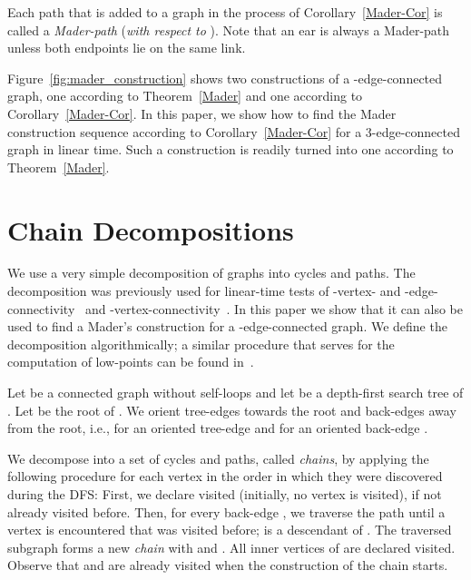 \documentclass[paper=a4]{scrartcl}
\begin{document}
Each path that is added to a graph  in the process of Corollary~\ref{Mader-Cor} is called a \emph{Mader-path} (\emph{with respect to }). Note that an ear is always a Mader-path unless both endpoints lie on the same link.

Figure~\ref{fig:mader_construction} shows two constructions of a -edge-connected graph, one according to Theorem~\ref{Mader} and one according to Corollary~\ref{Mader-Cor}. In this paper, we show how to find the Mader construction sequence according to Corollary~\ref{Mader-Cor} for a 3-edge-connected graph in linear time. Such a construction is readily turned into one according to Theorem~\ref{Mader}.


\section{Chain Decompositions}\label{sec:chain decomposition}

We use a very simple decomposition of graphs into cycles and paths. The decomposition was previously used for linear-time tests of -vertex- and -edge-connectivity~\cite{Schmidt2013a} and -vertex-connectivity~\cite{Schmidt2013}. In this paper we show that it can also be used to find a Mader's construction for a -edge-connected graph. We define the decomposition algorithmically; a similar procedure that serves for the computation of low-points can be found in~\cite{Ramachandran1993}.

Let  be a connected graph without self-loops and let  be a depth-first search tree of . Let  be the root of . We orient tree-edges towards the root and back-edges away from the root, i.e.,  for an oriented tree-edge  and  for an oriented back-edge . 


We decompose  into a set  of cycles and paths, called \emph{chains}, by applying the following procedure for each vertex  in the order in which they were discovered during the DFS:
First, we declare  visited (initially, no vertex is visited), if not already visited before. Then, for every back-edge , we traverse the path  until a vertex  is encountered that was visited before;  is a descendant of . The traversed subgraph  forms a new \emph{chain}  with  and . All inner vertices of  are declared visited. Observe that  and  are already visited when the construction of the chain starts.
\end{document}
